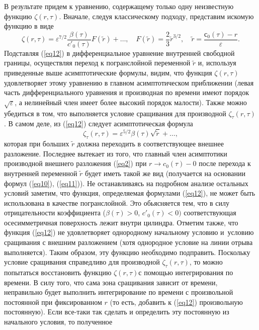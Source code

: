 \documentclass[press]{vestnik}
\begin{document}
В результате придем к уравнению, содержащему только одну неизвестную функцию 
$\zeta (r,\tau )$. Вначале, следуя классическому подходу, представим искомую 
функцию в виде
\begin{equation}
\label{eq12}
\zeta (r,\tau )=\varepsilon^{7/2}\frac{\beta (\tau )}{{c}'_{0} (\tau 
)}F(\tilde{{r}})+\ldots,
\quad
F(\tilde{{r}})=\frac{2}{3}\tilde{{r}}^{3/2},
\quad
\tilde{{r}}=
\frac{с_{0} (\tau )-r}{\varepsilon }.
\end{equation}
Подставляя (\ref{eq12}) в дифференциальное уравнение внутренней свободной границы, 
осуществляя переход к погранслойной переменной $\tilde{{r}}$ и, используя 
приведенные выше асимптотические формулы, видим, что функция $\zeta (r,\tau 
)$ удовлетворяет этому уравнению в главном асимптотическом приближении (левая 
часть дифференциального уравнения и производная по времени имеют порядок 
$\sqrt \varepsilon $, а нелинейный член имеет более высокий порядок 
малости). Также можно убедиться в том, что выполняется условие сращивания 
для производной $\zeta_{\tau } (r,\tau )$. В самом деле, из (\ref{eq12}) следует 
асимптотическая формула 
\[
\zeta_{\tau } (r,\tau )=\varepsilon^{5/2}\beta (\tau )\sqrt {\tilde{{r}}} 
+\ldots,
\]
которая при больших $\tilde{{r}}$ должна переходить в соответствующее внешнее 
разложение. Последнее вытекает из того, что главный член асимптотики 
производной внешнего разложения (\ref{eq2}) при $r\to c_{0} (\tau )-0$ после 
перехода к внутренней переменной $\tilde{{r}}$ будет иметь такой же вид 
(получается на основании формул (\ref{eq10}), (\ref{eq11})). Не останавливаясь на 
подробном анализе остальных условий заметим, что функция, определяемая 
формулами (\ref{eq12}), не может быть использована в качестве погранслойной. Это 
обьясняется тем, что в силу отрицательности коэффициента ($\beta (\tau )>0$, 
${c}'_{0} (\tau )<0)$ соответствующая осесимметричная поверхность лежит 
внутри цилиндра. Отметим также, что функция (\ref{eq12}) не удовлетворяет 
однородному начальному условию и~условию сращивания с внешним разложением 
(хотя однородное условие на линии отрыва выполняется). Таким образом, эту 
функцию необходимо подправить. Поскольку условие сращивания справедливо для 
производной $\zeta_{\tau } (r,\tau )$, то можно попытаться восстановить 
функцию $\zeta (r,\tau )$с помощью интегрирования по времени. В силу того, 
что сама зона сращивания зависит от времени, неправильно будет выполнить 
интегрирование по времени с произвольной постоянной при фиксированном $r$ 
(то есть, добавить к (\ref{eq12}) произвольную постоянную). Если все-таки так 
сделать и определить эту постоянную из начального условия, то полученное 
\end{document}
